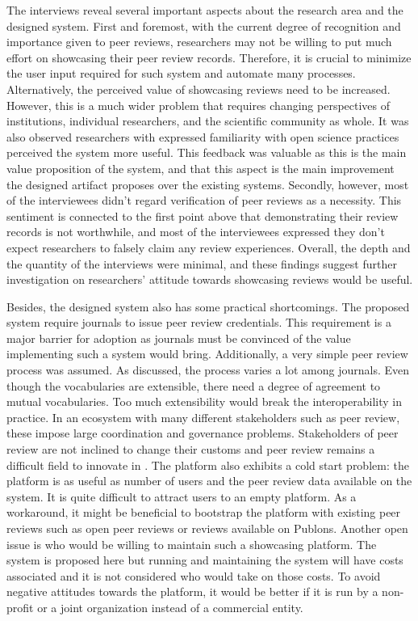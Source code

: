 The interviews reveal several important aspects about the research area and the designed system. First and foremost, with the current degree of recognition and importance given to peer reviews, researchers may not be willing to put much effort on showcasing their peer review records. Therefore, it is crucial to minimize the user input required for such system and automate many processes. Alternatively, the perceived value of showcasing reviews need to be increased. However, this is a much wider problem that requires changing perspectives of institutions, individual researchers, and the scientific community as whole. It was also observed researchers with expressed familiarity with open science practices perceived the system more useful. This feedback was valuable as this is the main value proposition of the system, and that this aspect is the main improvement the designed artifact proposes over the existing systems. Secondly, however, most of the interviewees didn't regard verification of peer reviews as a necessity. This sentiment is connected to the first point above that demonstrating their review records is not worthwhile, and most of the interviewees expressed they don't expect researchers to falsely claim any review experiences. Overall, the depth and the quantity of the interviews were minimal, and these findings suggest further investigation on researchers' attitude towards showcasing reviews would be useful.

Besides, the designed system also has some practical shortcomings. The proposed system require journals to issue peer review credentials. This requirement is a major barrier for adoption as journals must be convinced of the value implementing such a system would bring. Additionally, a very simple peer review process was assumed. As discussed, the process varies a lot among journals. Even though the vocabularies are extensible, there need a degree of agreement to mutual vocabularies. Too much extensibility would break the interoperability in practice. In an ecosystem with many different stakeholders such as peer review, these impose large coordination and governance problems. Stakeholders of peer review are not inclined to change their customs and peer review remains a difficult field to innovate in \parencite[3]{Tennant.2018b}. The platform also exhibits a cold start problem: the platform is as useful as number of users and the peer review data available on the system. It is quite difficult to attract users to an empty platform. As a workaround, it might be beneficial to bootstrap the platform with existing peer reviews such as open peer reviews or reviews available on Publons. Another open issue is who would be willing to maintain such a showcasing platform. The system is proposed here but running and maintaining the system will have costs associated and it is not considered who would take on those costs. To avoid negative attitudes towards the platform, it would be better if it is run by a non-profit or a joint organization instead of a commercial entity. 
 
